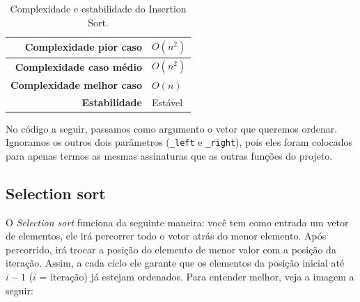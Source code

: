 \begin{table}[H]
 \centering
	\begin{tabular}{| r | l |}
		\hline
		\textbf{Complexidade pior caso}   & $O(n^{2})$ \\
		\hline
		\textbf{Complexidade caso médio}  & $O(n^{2})$ \\
		\hline
		\textbf{Complexidade melhor caso} & $O(n)$ \\
		\hline
		\textbf{Estabilidade}             & Estável \\
		\hline
	\end{tabular}
	\caption{Complexidade e estabilidade do Insertion Sort.}
	\label{t_insertion_sort}
\end{table}

No código a seguir, passamos como argumento o vetor que queremos ordenar. Ignoramos os outros dois parâmetros (\texttt{\_left} e \texttt{\_right}), pois eles foram colocados para apenas termos as mesmas assinaturas que as outras funções do projeto.



\subsection{Selection sort}
O \textit{Selection sort} funciona da seguinte maneira: você tem como entrada um vetor de elementos, ele irá percorrer todo o vetor atrás do menor elemento. Após percorrido, irá trocar a posição do elemento de menor valor com a posição da iteração. Assim, a cada ciclo ele garante que os elementos da posição inicial até $i-1$ ($i$ = iteração) já estejam ordenados. Para entender melhor, veja a imagem a seguir:

